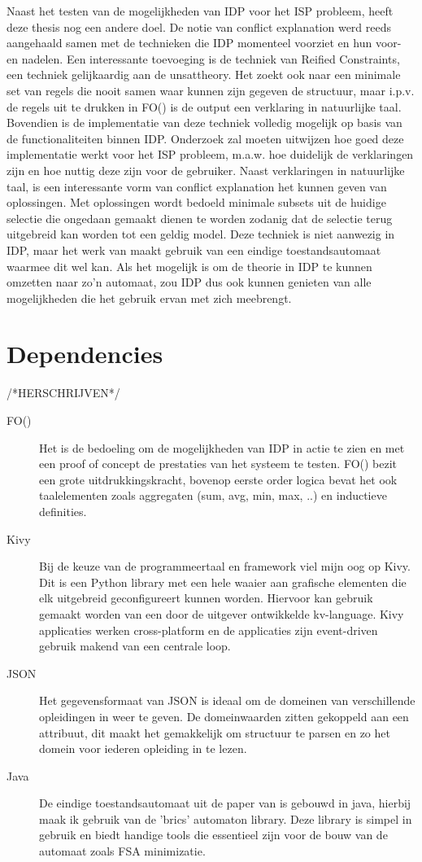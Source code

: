 Naast het testen van de mogelijkheden van IDP voor het ISP probleem, heeft deze thesis nog een andere doel. De notie van conflict explanation werd reeds aangehaald samen met de technieken die IDP momenteel voorziet en hun voor- en nadelen. Een interessante toevoeging is de techniek van Reified Constraints, een techniek gelijkaardig aan de unsattheory. Het zoekt ook naar een minimale set van regels die nooit samen waar kunnen zijn gegeven de structuur, maar i.p.v. de regels uit te drukken in FO(\textperiodcentered) is de output een verklaring in natuurlijke taal. Bovendien is de implementatie van deze techniek volledig mogelijk op basis van de functionaliteiten binnen IDP. Onderzoek zal moeten uitwijzen hoe goed deze implementatie werkt voor het ISP probleem, m.a.w. hoe duidelijk de verklaringen zijn en hoe nuttig deze zijn voor de gebruiker.
Naast verklaringen in natuurlijke taal, is een interessante vorm van conflict explanation het kunnen geven van oplossingen. Met oplossingen wordt bedoeld minimale subsets uit de huidige selectie die ongedaan gemaakt dienen te worden zodanig dat de selectie terug uitgebreid kan worden tot een geldig model. Deze techniek is niet aanwezig in IDP, maar het werk van \citep{amilhastre2002consistency} maakt gebruik van een eindige toestandsautomaat waarmee dit wel kan. Als het mogelijk is om de theorie in IDP te kunnen omzetten naar zo'n automaat, zou IDP dus ook kunnen genieten van alle mogelijkheden die het gebruik ervan met zich meebrengt. 

\section{Dependencies}
/*HERSCHRIJVEN*/
\begin{description}
\item [FO(\textperiodcentered)] Het is de bedoeling om de mogelijkheden van IDP in actie te zien en met een proof of concept de prestaties van het systeem te testen. FO(\textperiodcentered) bezit een grote uitdrukkingskracht, bovenop eerste order logica bevat het ook taalelementen zoals aggregaten (sum, avg, min, max, ..) en inductieve definities.
\item [Kivy] Bij de keuze van de programmeertaal en framework viel mijn oog op Kivy. Dit is een Python library met een hele waaier aan grafische elementen die elk uitgebreid geconfigureert kunnen worden. Hiervoor kan gebruik gemaakt worden van een door de uitgever ontwikkelde kv-language. Kivy applicaties werken cross-platform en de applicaties zijn event-driven gebruik makend van een centrale loop.
\item [JSON] Het gegevensformaat van JSON is ideaal om de domeinen van verschillende opleidingen in weer te geven. De domeinwaarden zitten gekoppeld aan een attribuut, dit maakt het gemakkelijk om structuur te parsen en zo het domein voor iederen opleiding in te lezen.
\item [Java] De eindige toestandsautomaat uit de paper van \citep{amilhastre2002consistency} is gebouwd in java, hierbij maak ik gebruik van de 'brics' automaton library. Deze library is simpel in gebruik en biedt handige tools die essentieel zijn voor de bouw van de automaat zoals FSA minimizatie. 
\end{description}